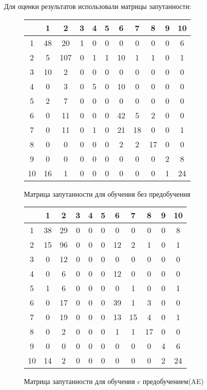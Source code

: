 {    Для оценки результатов использовали матрицы запутанности:

    \begin{figure}[H]
        \centering
        \begin{tabular}{|c|c|c|c|c|c|c|c|c|c|c|}
            \hline
              & 1 & 2 & 3 & 4 & 5 & 6 & 7 & 8 & 9 & 10 \\ \hline
            1 & 48 & 20 & 1 & 0 & 0 & 0 & 0 & 0 & 0 & 6 \\ \hline
            2 & 5 & 107 & 0 & 1 & 1 & 10 & 1 & 1 & 0 & 1 \\ \hline
            3 & 10 & 2 & 0 & 0 & 0 & 0 & 0 & 0 & 0 & 0 \\ \hline
            4 & 0 & 3 & 0 & 5 & 0 & 10 & 0 & 0 & 0 & 0 \\ \hline
            5 & 2 & 7 & 0 & 0 & 0 & 0 & 0 & 0 & 0 & 0 \\ \hline
            6 & 0 & 11 & 0 & 0 & 0 & 42 & 5 & 2 & 0 & 0 \\ \hline
            7 & 0 & 11 & 0 & 1 & 0 & 21 & 18 & 0 & 0 & 1 \\ \hline
            8 & 0 & 0 & 0 & 0 & 0 & 2 & 2 & 17 & 0 & 0 \\ \hline
            9 & 0 & 0 & 0 & 0 & 0 & 0 & 0 & 0 & 2 & 8 \\ \hline
            10 & 16 & 1 & 0 & 0 & 0 & 0 & 0 & 0 & 1 & 24 \\ \hline
        \end{tabular}
        \caption{Матрица запутанности для обучения без предобучения}
    \end{figure}

    \begin{figure}[H]

        \centering
        \begin{tabular}{|c|c|c|c|c|c|c|c|c|c|c|}
        \hline
            & 1 & 2 & 3 & 4 & 5 & 6 & 7 & 8 & 9 & 10 \\ \hline
            1 & 38 & 29 & 0 & 0 & 0 & 0 & 0 & 0 & 0 & 8 \\ \hline
            2 & 15 & 96 & 0 & 0 & 0 & 12 & 2 & 1 & 0 & 1 \\ \hline
            3 & 0 & 12 & 0 & 0 & 0 & 0 & 0 & 0 & 0 & 0 \\ \hline
            4 & 0 & 6 & 0 & 0 & 0 & 12 & 0 & 0 & 0 & 0 \\ \hline
            5 & 1 & 6 & 0 & 0 & 0 & 0 & 1 & 0 & 0 & 1 \\ \hline
            6 & 0 & 17 & 0 & 0 & 0 & 39 & 1 & 3 & 0 & 0 \\ \hline
            7 & 0 & 19 & 0 & 0 & 0 & 13 & 15 & 4 & 0 & 1 \\ \hline
            8 & 0 & 2 & 0 & 0 & 0 & 1 & 1 & 17 & 0 & 0 \\ \hline
            9 & 0 & 0 & 0 & 0 & 0 & 0 & 0 & 0 & 4 & 6 \\ \hline
            10 & 14 & 2 & 0 & 0 & 0 & 0 & 0 & 0 & 2 & 24 \\ \hline
        \end{tabular}
        \caption{Матрица запутанности для обучения c предобучением(AE)}
    \end{figure}

}
